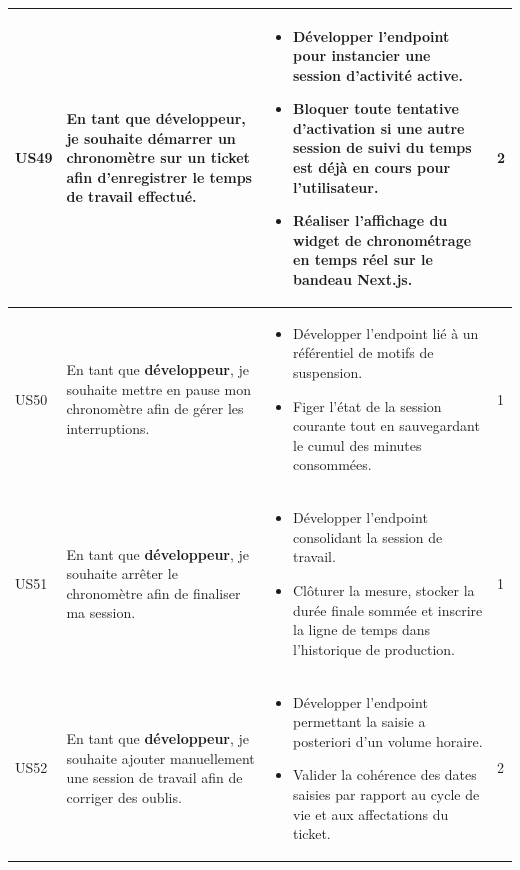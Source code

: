 \begin{longtable}{|C{1cm}|L{5.6cm}|L{8cm}|C{0.85cm}|}
US49 & En tant que \textbf{développeur}, je souhaite démarrer un chronomètre sur un ticket afin d'enregistrer le temps de travail effectué. &
\begin{itemize}[nosep, left=0pt, label={$\bullet$}]
\item Développer l'endpoint pour instancier une session d'activité active.
\item Bloquer toute tentative d'activation si une autre session de suivi du temps est déjà en cours pour l'utilisateur.
\item Réaliser l'affichage du widget de chronométrage en temps réel sur le bandeau Next.js.
\end{itemize} & 2 \\
\hline

US50 & En tant que \textbf{développeur}, je souhaite mettre en pause mon chronomètre afin de gérer les interruptions. &
\begin{itemize}[nosep, left=0pt, label={$\bullet$}]
\item Développer l'endpoint lié à un référentiel de motifs de suspension.
\item Figer l'état de la session courante tout en sauvegardant le cumul des minutes consommées.
\end{itemize} & 1 \\
\hline

US51 & En tant que \textbf{développeur}, je souhaite arrêter le chronomètre afin de finaliser ma session. &
\begin{itemize}[nosep, left=0pt, label={$\bullet$}]
\item Développer l'endpoint consolidant la session de travail.
\item Clôturer la mesure, stocker la durée finale sommée et inscrire la ligne de temps dans l'historique de production.
\end{itemize} & 1 \\
\hline

US52 & En tant que \textbf{développeur}, je souhaite ajouter manuellement une session de travail afin de corriger des oublis. &
\begin{itemize}[nosep, left=0pt, label={$\bullet$}]
\item Développer l'endpoint permettant la saisie a posteriori d'un volume horaire.
\item Valider la cohérence des dates saisies par rapport au cycle de vie et aux affectations du ticket.
\end{itemize} & 2 \\
\hline


\end{longtable}
